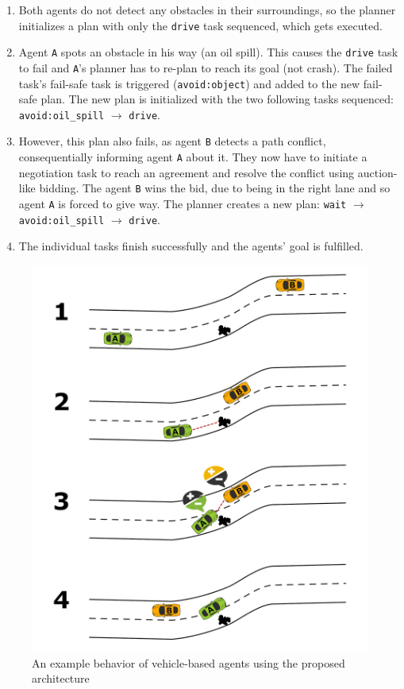 \documentclass[0main.tex]{subfiles}
\begin{document}
\begin{enumerate}
    \item Both agents do not detect any obstacles in their surroundings, so the planner
    initializes a plan with only the \texttt{drive} task sequenced, which gets executed. 

    \item Agent \texttt{A} spots an obstacle in his way (an oil spill). This causes the
    \texttt{drive} task to fail and \texttt{A}'s planner has to re-plan to reach its goal (not
    crash). The failed task's fail-safe task is triggered (\texttt{avoid:object})
    and added to the new fail-safe plan. The new plan is initialized with the two
    following tasks sequenced: \texttt{avoid:oil\_spill} $\rightarrow$ \texttt{drive}.
    
    \item However, this plan also fails, as agent \texttt{B} detects a path conflict, consequentially 
    informing agent \texttt{A} about it. They now have to initiate a negotiation task to reach an agreement and
    resolve the conflict using auction-like bidding. The agent \texttt{B} wins the bid, due
    to being in the right lane and so agent \texttt{A} is forced to give way. The planner
    creates a new plan: \texttt{wait} $\rightarrow$ \texttt{avoid:oil\_spill} $\rightarrow$
    \texttt{drive}.
    
    \item The individual tasks finish successfully and the agents' goal is fulfilled.
\end{enumerate}

\begin{figure}[htbp]
    \centering
    \includegraphics[width=.8\textwidth]{AgentPlanning.png}
    \caption{An example behavior of vehicle-based agents using the proposed architecture}
    \label{agentReplanning}
\end{figure}
\end{document}
